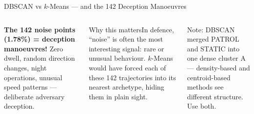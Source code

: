 \documentclass[aspectratio=169,10pt,t]{beamer}
\begin{document}
\begin{frame}{DBSCAN vs $k$-Means --- and the 142 Deception Manoeuvres}
\begin{columns}[T]
\begin{wbox}\scriptsize\textbf{The 142 noise points (1.78\%) = deception manoeuvres!} Zero dwell, random direction changes, night operations, unusual speed patterns --- deliberate adversary deception.\end{wbox}
\begin{cbox}[ISSAnavy]{Why this matters}\scriptsize In defence, ``noise'' is often the most interesting signal: rare or unusual behaviour. $k$-Means would have forced each of these 142 trajectories into its nearest archetype, hiding them in plain sight.\end{cbox}
\begin{ibox}\scriptsize Note: DBSCAN merged PATROL and STATIC into one dense cluster A --- density-based and centroid-based methods see different structure. Use both.\end{ibox}
\end{columns}
\end{frame}
\end{document}
